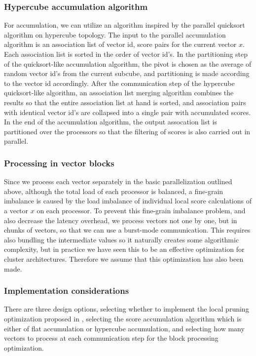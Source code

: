 \documentclass{comjnl}
\begin{document}
\subsubsection {Hypercube accumulation algorithm}
For accumulation, we can utilize an algorithm inspired by the parallel
quicksort algorithm on hypercube topology. The input to the parallel
accumulation algorithm is an association list of vector id, score
pairs for the current vector $x$.  Each association list is sorted in
the order of vector id's. In the partitioning step of the quicksort-like
accumulation algorithm, the pivot is chosen as the average of random
vector id's from the current subcube, and partitioning is made according
to the vector id accordingly. After the communication step of the
hypercube quicksort-like algorithm, an association list merging
algorithm combines the results so that the entire association list at
hand is sorted, and association pairs with identical vector id's are
collapsed into a single pair with accumulated scores. In the end of
the accumulation algorithm, the output assocation list is partitioned
over the processors so that the filtering of scores is also carried
out in parallel.


\subsubsection{Processing in vector blocks}

Since we process each vector separately in the basic parallelization
outlined above, although the total load of each processor is balanced,
a fine-grain imbalance is caused by the load imbalance of individual
local score calculations of a vector $x$ on each processor. To prevent
this fine-grain imbalance problem, and also decrease the latency
overhead, we process vectors not one by one, but in chunks of vectors,
so that we can use a burst-mode communication. This requires also
bundling the intermediate values so it naturally creates some
algorithmic complexity, but in practice we have seen this to be an
effective optimization for cluster architectures. Therefore we assume
that this optimization has also been made.

\subsubsection{Implementation considerations}
\label{sec:vertimpl}

There are three design options, selecting whether to implement the
local pruning optimization proposed in , 
selecting the score accumulation
algorithm which is either of flat  accumulation or
hypercube accumulation, and selecting how many vectors to process at each
communication step for the block processing optimization.
\end{document}
